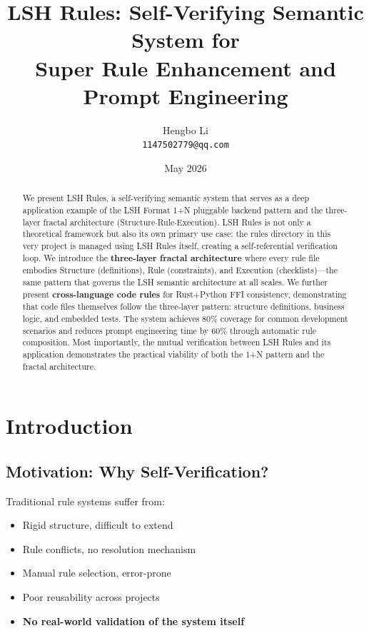 \documentclass{article}
\title{LSH Rules: Self-Verifying Semantic System for\\Super Rule Enhancement and Prompt Engineering}
\author{Hengbo Li\\
\texttt{1147502779@qq.com}
}
\date{May 2026}
\begin{document}
\maketitle

\begin{abstract}
We present LSH Rules, a self-verifying semantic system that serves as a deep application example of the LSH Format 1+N pluggable backend pattern and the three-layer fractal architecture (Structure$\cdot$Rule$\cdot$Execution). LSH Rules is not only a theoretical framework but also its own primary use case: the rules directory in this very project is managed using LSH Rules itself, creating a self-referential verification loop. We introduce the \textbf{three-layer fractal architecture} where every rule file embodies Structure (definitions), Rule (constraints), and Execution (checklists)---the same pattern that governs the LSH semantic architecture at all scales. We further present \textbf{cross-language code rules} for Rust+Python FFI consistency, demonstrating that code files themselves follow the three-layer pattern: structure definitions, business logic, and embedded tests. The system achieves 80\% coverage for common development scenarios and reduces prompt engineering time by 60\% through automatic rule composition. Most importantly, the mutual verification between LSH Rules and its application demonstrates the practical viability of both the 1+N pattern and the fractal architecture.
\end{abstract}

\section{Introduction}

\subsection{Motivation: Why Self-Verification?}

Traditional rule systems suffer from:
\begin{itemize}
    \item Rigid structure, difficult to extend
    \item Rule conflicts, no resolution mechanism
    \item Manual rule selection, error-prone
    \item Poor reusability across projects
    \item \textbf{No real-world validation of the system itself}
\end{itemize}
\end{document}
